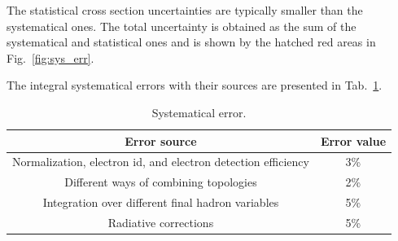 The statistical cross section uncertainties are typically smaller than the systematical ones. The total uncertainty is obtained as the sum of the systematical and statistical ones and is shown by the hatched red areas in Fig.~\ref{fig:sys_err}.
 
The integral systematical errors with their sources are presented in Tab.~\ref{tab:sys_err}.
 
\begin{table}[htp]
\centering 

\begin{tabular}{|c|c|}

\hline
Error source & Error value\\ \hline
Normalization, electron id, and
 electron detection efficiency & 3\% \\ \hline
Different ways of combining topologies & 2\%\\ \hline 
Integration over different final hadron variables & 5\%\\ \hline 
Radiative corrections & 5\% \\ \hline 
\end{tabular}
\caption{\small Systematical error. \label{tab:sys_err}}
\end{table}  

